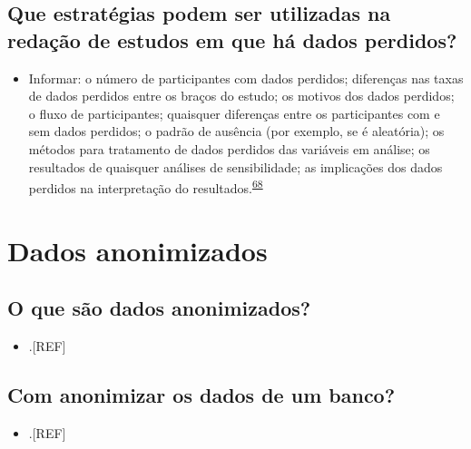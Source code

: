 \documentclass[
  a4paper,
]{book}
\providecommand{\tightlist}{%
  \setlength{\itemsep}{0pt}\setlength{\parskip}{0pt}}
\begin{document}
\hypertarget{que-estratuxe9gias-podem-ser-utilizadas-na-redauxe7uxe3o-de-estudos-em-que-huxe1-dados-perdidos}{%
\subsection{Que estratégias podem ser utilizadas na redação de estudos em que há dados perdidos?}\label{que-estratuxe9gias-podem-ser-utilizadas-na-redauxe7uxe3o-de-estudos-em-que-huxe1-dados-perdidos}}

\begin{itemize}
\tightlist
\item
  Informar: o número de participantes com dados perdidos; diferenças nas taxas de dados perdidos entre os braços do estudo; os motivos dos dados perdidos; o fluxo de participantes; quaisquer diferenças entre os participantes com e sem dados perdidos; o padrão de ausência (por exemplo, se é aleatória); os métodos para tratamento de dados perdidos das variáveis em análise; os resultados de quaisquer análises de sensibilidade; as implicações dos dados perdidos na interpretação do resultados.\textsuperscript{\protect\hyperlink{ref-Akl2015}{68}}
\end{itemize}

\hypertarget{dados-anonimizados}{%
\section{Dados anonimizados}\label{dados-anonimizados}}

\hypertarget{o-que-suxe3o-dados-anonimizados}{%
\subsection{O que são dados anonimizados?}\label{o-que-suxe3o-dados-anonimizados}}

\begin{itemize}
\tightlist
\item
  .{[}REF{]}
\end{itemize}

\hypertarget{com-anonimizar-os-dados-de-um-banco}{%
\subsection{Com anonimizar os dados de um banco?}\label{com-anonimizar-os-dados-de-um-banco}}

\begin{itemize}
\tightlist
\item
  .{[}REF{]}
\end{itemize}
\end{document}
